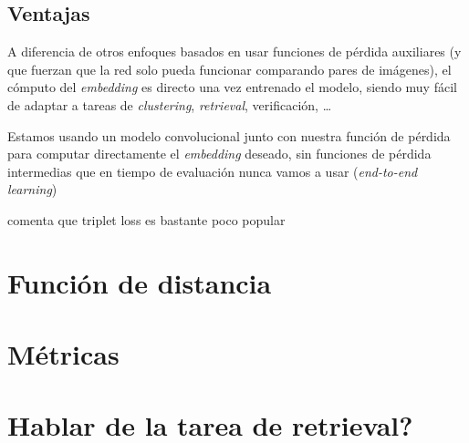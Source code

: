 

\subsection{Ventajas}

A diferencia de otros enfoques basados en usar funciones de pérdida auxiliares (y que fuerzan que la red solo pueda funcionar comparando pares de imágenes), el cómputo del \textit{embedding} es directo una vez entrenado el modelo, siendo muy fácil de adaptar a tareas de \textit{clustering}, \textit{retrieval}, verificación, \ldots \cite{informatica:principal}

Estamos usando un modelo convolucional junto con nuestra función de pérdida para computar directamente el \textit{embedding} deseado, sin funciones de pérdida intermedias que en tiempo de evaluación nunca vamos a usar (\textit{end-to-end learning}) \cite{informatica:principal}

\cite{informatica:principal} comenta que triplet loss es bastante poco popular

\section{Función de distancia}


\section{Métricas}


\section{Hablar de la tarea de retrieval?}
